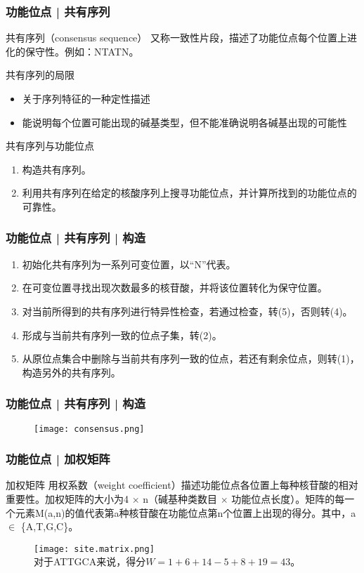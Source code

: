 \begin{frame}
  \frametitle{功能位点 | 共有序列}
  \begin{block}{共有序列（consensus sequence）}
    又称一致性片段，描述了功能位点每个位置上进化的保守性。例如：NTATN。
  \end{block}
  \pause
  \begin{block}{共有序列的局限}
    \begin{itemize}
      \item 关于序列特征的一种定性描述
      \item 能说明每个位置可能出现的碱基类型，但不能准确说明各碱基出现的可能性
    \end{itemize}
  \end{block}
  \pause
  \begin{block}{共有序列与功能位点}
    \begin{enumerate}
      \item 构造共有序列。
      \item 利用共有序列在给定的核酸序列上搜寻功能位点，并计算所找到的功能位点的可靠性。
    \end{enumerate}
  \end{block}
\end{frame}

\begin{frame}
  \frametitle{功能位点 | 共有序列 | 构造}
  \begin{enumerate}
    \item 初始化共有序列为一系列可变位置，以“N”代表。
    \item 在可变位置寻找出现次数最多的核苷酸，并将该位置转化为保守位置。
    \item 对当前所得到的共有序列进行特异性检查，若通过检查，转(5)，否则转(4)。
    \item 形成与当前共有序列一致的位点子集，转(2)。
    \item 从原位点集合中删除与当前共有序列一致的位点，若还有剩余位点，则转(1)，构造另外的共有序列。
  \end{enumerate}
\end{frame}

\begin{frame}
  \frametitle{功能位点 | 共有序列 | 构造}
  \begin{figure}
    \centering
    \texttt{[image: consensus.png]}
  \end{figure}
\end{frame}

\begin{frame}
  \frametitle{功能位点 | 加权矩阵}
  \begin{block}{加权矩阵}
    用权系数（weight coefficient）描述功能位点各位置上每种核苷酸的相对重要性。加权矩阵的大小为4 $\times$ n（碱基种类数目 $\times$ 功能位点长度）。矩阵的每一个元素M(a,n)的值代表第a种核苷酸在功能位点第n个位置上出现的得分。其中，a $\in$ \{A,T,G,C\}。
  \end{block}
  \begin{figure}
    \centering
    \texttt{[image: site.matrix.png]}
  \\ 对于ATTGCA来说，得分$W = 1 + 6 + 14 - 5 + 8 + 19 = 43$。
  \end{figure}
\end{frame}

